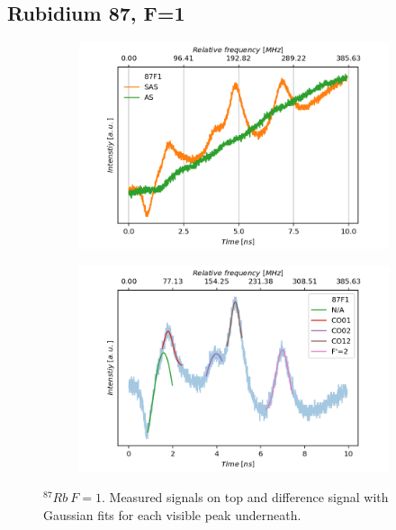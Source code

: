 \documentclass[]{article}
\begin{document}
\subsection{Rubidium 87, F=1}
\begin{figure}[H]
\centering
\begin{subfigure}{.7\textwidth}
\includegraphics[width=\linewidth]{Plots/87F1_Both.png}
\end{subfigure}

\begin{subfigure}[c]{.7\textwidth}
\includegraphics[width=\linewidth]{Plots/87F1_Diff.png}
\end{subfigure}
\caption{$^{87}Rb\ F=1 $. Measured signals on top and difference signal with Gaussian fits for each visible peak underneath.}
\label{fig: 87F1}
\end{figure}
\end{document}

